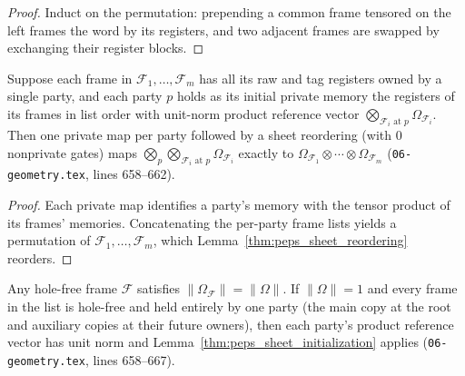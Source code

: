 \begin{proof}\leanok
    Induct on the permutation: prepending a common frame tensored on the left frames the word by its registers, and two adjacent frames are swapped by exchanging their register blocks.
\end{proof}

\begin{lemma}
    \label{thm:peps_sheet_initialization}
    \leanok
    Suppose each frame in $\mathcal F_1,\dots,\mathcal F_m$ has all its raw and tag registers owned by a single party, and each party $p$ holds as its initial private memory the registers of its frames in list order with unit-norm product reference vector $\bigotimes_{\mathcal F_i\text{ at }p}\Omega_{\mathcal F_i}$. Then one private map per party followed by a sheet reordering (with $0$ nonprivate gates) maps $\bigotimes_p\bigotimes_{\mathcal F_i\text{ at }p}\Omega_{\mathcal F_i}$ exactly to $\Omega_{\mathcal F_1}\otimes\cdots\otimes\Omega_{\mathcal F_m}$ (\texttt{06-geometry.tex}, lines 658--662).
\end{lemma}

\begin{proof}\leanok
    Each private map identifies a party's memory with the tensor product of its frames' memories. Concatenating the per-party frame lists yields a permutation of $\mathcal F_1,\dots,\mathcal F_m$, which Lemma~\ref{thm:peps_sheet_reordering} reorders.
\end{proof}

\begin{lemma}
    \label{thm:peps_sheet_raw_initialization}
    \leanok
    Any hole-free frame $\mathcal F$ satisfies $\lVert\Omega_{\mathcal F}\rVert=\lVert\Omega\rVert$. If $\lVert\Omega\rVert=1$ and every frame in the list is hole-free and held entirely by one party (the main copy at the root and auxiliary copies at their future owners), then each party's product reference vector has unit norm and Lemma~\ref{thm:peps_sheet_initialization} applies (\texttt{06-geometry.tex}, lines 658--667).
\end{lemma}

